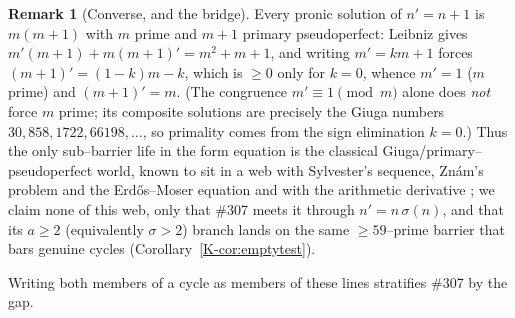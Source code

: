 \documentclass[11pt]{article}
\theoremstyle{definition}
\newtheorem{remark}[theorem]{Remark}
\begin{document}
\begin{remark}[Converse, and the bridge]
Every pronic solution of $n'=n+1$ is $m(m+1)$ with $m$ prime and $m+1$ primary pseudoperfect: Leibniz
gives $m'(m+1)+m(m+1)'=m^2+m+1$, and writing $m'=km+1$ forces $(m+1)'=(1-k)m-k$, which is $\ge0$ only for
$k=0$, whence $m'=1$ ($m$ prime) and $(m+1)'=m$. (The congruence $m'\equiv1\pmod m$ alone does \emph{not}
force $m$ prime; its composite solutions are precisely the Giuga numbers $30,858,1722,66198,\dots$,
so primality comes from the sign elimination $k=0$.) Thus the only sub--barrier life in the form equation
is the classical Giuga/primary--pseudoperfect world, known to sit in a web with Sylvester's sequence,
Zn\'am's problem and the Erd\H{o}s--Moser equation \cite{SondowMacMillan2017} and with the arithmetic
derivative \cite{GrauOllerMarcen2012,GrauOllerMarcenSadornil2021}; we claim none of this web, only that
\#307 meets it through $n'=n\,\sigma(n)$, and that its $a\ge2$ (equivalently $\sigma>2$) branch lands on
the same $\ge59$--prime barrier \cite{BorweinWong1997} that bars genuine cycles
(Corollary~\ref{K-cor:emptytest}).
\end{remark}

Writing both members of a cycle as members of these lines stratifies \#307 by the gap.
\end{document}
